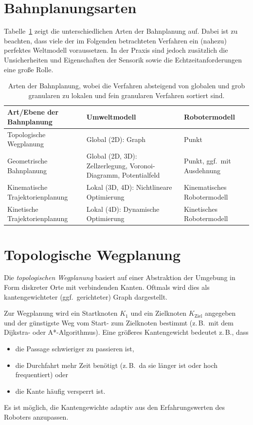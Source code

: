 \documentclass[a4paper, 11pt, accentcolor = tud3b]{tudreport}
\newcommand{\zB}{z.\,B.~}
\newcommand{\ggf}{ggf.~}
\begin{document}
		\section{Bahnplanungsarten}
			Tabelle~\ref{tab:path_planning_types} zeigt die unterschiedlichen Arten der Bahnplanung auf. Dabei ist zu beachten, dass viele der im Folgenden betrachteten Verfahren ein (nahezu) perfektes Weltmodell voraussetzen. In der Praxis sind jedoch zusätzlich die Unsicherheiten und Eigenschaften der Sensorik sowie die Echtzeitanforderungen eine große Rolle.
			
			\begin{table}
				\centering
				\begin{tabular}{l|p{6cm}|p{4cm}}
					\textbf{Art/Ebene der Bahnplanung} & \textbf{Umweltmodell}                                           & \textbf{Robotermodell}      \\ \hline
					Topologische Wegplanung            & Global (2D): Graph                                              & Punkt                       \\ \hline
					Geometrische Bahnplanung           & Global (2D, 3D): Zellzerlegung, Voronoi-Diagramm, Potentialfeld & Punkt, \ggf mit Ausdehnung  \\ \hline
					Kinematische Trajektorienplanung   & Lokal (3D, 4D): \newline Nichtlineare Optimierung               & Kinematisches Robotermodell \\ \hline
					Kinetische Trajektorienplanung     & Lokal (4D): \newline Dynamische Optimierung                     & Kinetisches Robotermodell
				\end{tabular}
				\caption{Arten der Bahnplanung, wobei die Verfahren absteigend von globalen und grob granularen zu lokalen und fein granularen Verfahren sortiert sind.}
				\label{tab:path_planning_types}
			\end{table}

		\section{Topologische Wegplanung}
			Die \emph{topologischen Wegplanung} basiert auf einer Abstraktion der Umgebung in Form diskreter Orte mit verbindenden Kanten. Oftmals wird dies als kantengewichteter (\ggf gerichteter) Graph dargestellt.
			
			Zur Wegplanung wird ein Startknoten \(K_1\) und ein Zielknoten \(K_\text{Ziel}\) angegeben und der günstigste Weg vom Start- zum Zielknoten bestimmt (\zB mit dem Dijkstra- oder A*-Algorithmus). Eine größeres Kantengewicht bedeutet z.\,B., dass
			\begin{itemize}
				\item die Passage schwieriger zu passieren ist,
				\item die Durchfahrt mehr Zeit benötigt (\zB da sie länger ist oder hoch frequentiert) oder
				\item die Kante häufig versperrt ist.
			\end{itemize}
			Es ist möglich, die Kantengewichte adaptiv aus den Erfahrungswerten des Roboters anzupassen.
\end{document}
